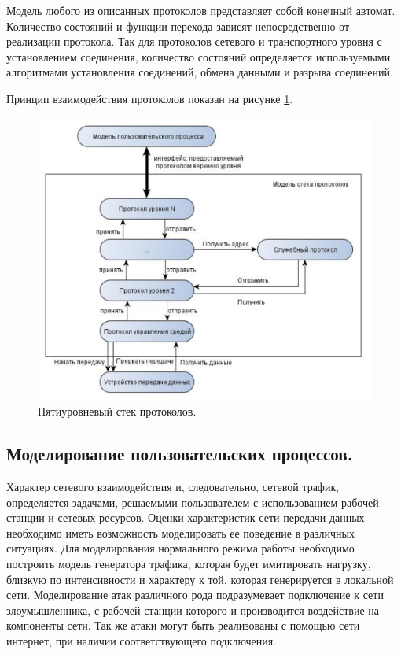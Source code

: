 \documentclass[12pt]{report}
\begin{document}
    Модель любого из описанных протоколов представляет собой конечный автомат. Количество состояний и функции перехода зависят непосредственно от реализации протокола. Так для протоколов сетевого и транспортного уровня с установлением соединения, количество состояний определяется используемыми алгоритмами установления соединений, обмена данными и разрыва соединений.

    Принцип взаимодействия протоколов показан на рисунке \ref{Pic9}.

    \begin{figure}\center
        \includegraphics[width = 120mm]{Ch2Pic9}
        \caption{Пятиуровневый стек протоколов.} \label{Pic9}
    \end{figure}

    \subsection{Моделирование пользовательских процессов. }

    Характер сетевого взаимодействия и, следовательно, сетевой трафик, определяется задачами, решаемыми пользователем с использованием рабочей станции и сетевых ресурсов. Оценки характеристик сети передачи данных необходимо иметь возможность моделировать ее поведение в различных ситуациях. Для моделирования нормального режима работы необходимо построить модель генератора трафика, которая будет имитировать нагрузку, близкую по интенсивности и характеру к той, которая генерируется в локальной сети. Моделирование атак различного рода подразумевает подключение к сети злоумышленника, с рабочей станции которого и производится воздействие на компоненты сети. Так же атаки могут быть реализованы с помощью сети интернет, при наличии соответствующего подключения.
\end{document}
